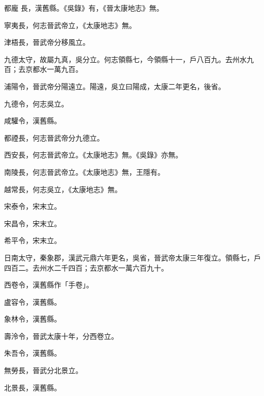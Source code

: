 \begin{pinyinscope}
都龐
 長，漢舊縣。《吳錄》有，《晉太康地志》無。



 寧夷長，何志晉武帝立，《太康地志》無。



 津梧長，晉武帝分移風立。



 九德太守，故屬九真，吳分立。何志領縣七，今領縣十一，戶八百九。去州水九百；去京都水一萬九百。



 浦陽令，晉武帝分陽遠立。陽遠，吳立曰陽成，太康二年更名，後省。



 九德令，何志吳立。



 咸驩令，漢舊縣。



 都禋長，何志晉武帝分九德立。



 西安長，何志晉武帝立。《太康地志》無。《吳錄》亦無。



 南陵長，何志晉武帝立。《太康地志》無，王隱有。



 越常長，何志吳立，《太康地志》無。



 宋泰令，宋末立。



 宋昌令，宋末立。



 希平令，宋末立。



 日南太守，秦象郡，漢武元鼎六年更名，吳省，晉武帝太康三年復立。領縣七，戶四百二。去州水二千四百；去京都水一萬六百九十。



 西卷令，漢舊縣作「手卷」。



 盧容令，漢舊縣。



 象林令，漢舊縣。



 壽泠令，晉武太康十年，分西卷立。



 朱吾令，漢舊縣。



 無勞長，晉武分北景立。



 北景長，漢舊縣。




\end{pinyinscope}
